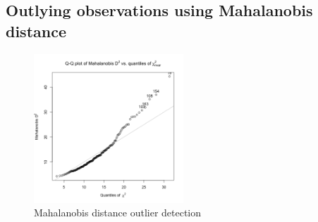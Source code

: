 \subsection{Outlying observations using Mahalanobis distance}
\begin{figure}[H]
  \centering
  \includegraphics[width=0.5\textwidth]{figs/outliers.png}
  \caption{Mahalanobis distance outlier detection}
  \label{fig:mahalanobis}
\end{figure}